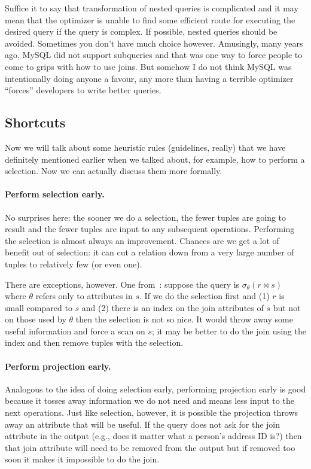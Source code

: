 \documentclass[a4paper]{report}
\begin{document}
Suffice it to say that transformation of nested queries is complicated and it may mean that the optimizer is unable to find some efficient route for executing the desired query if the query is complex. If possible, nested queries should be avoided. Sometimes you don't have much choice however. Amusingly, many years ago, MySQL did not support subqueries and that was one way to force people to come to grips with how to use joins. But somehow I do not think MySQL was intentionally doing anyone a favour, any more than having a terrible optimizer ``forces'' developers to write better queries. 


\subsection*{Shortcuts}

Now we will talk about some heuristic rules (guidelines, really) that we have definitely mentioned earlier when we talked about, for example, how to perform a selection. Now we can actually discuss them more formally.

\paragraph{Perform selection early.} No surprises here: the sooner we do a selection, the fewer tuples are going to result and the fewer tuples are input to any subsequent operations. Performing the selection is almost always an improvement. Chances are we get a lot of benefit out of selection: it can cut a relation down from a very large number of tuples to relatively few (or even one). 

There are exceptions, however. One from~\cite{dsc}: suppose the query is $\sigma_{\theta}( r \bowtie s )$ where $\theta$ refers only to attributes in $s$. If we do the selection first and (1) $r$ is small compared to $s$ and (2) there is an index on the join attributes of $s$ but not on those used by $\theta$ then the selection is not so nice. It would throw away some useful information and force a scan on $s$; it may be better to do the join using the index and then remove tuples with the selection.

\paragraph{Perform projection early.} Analogous to the idea of doing selection early, performing projection early is good because it tosses away information we do not need and means less input to the next operations. Just like selection, however, it is possible the projection throws away an attribute that will be useful. If the query does not ask for the join attribute in the output (e.g., does it matter what a person's address ID is?) then that join attribute will need to be removed from the output but if removed too soon it makes it impossible to do the join.
\end{document}
